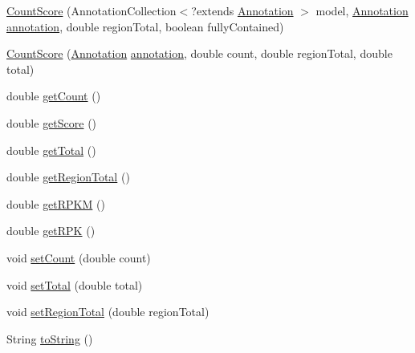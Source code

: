\begin{DoxyCompactItemize}
\item 
\hyperlink{classumms_1_1core_1_1model_1_1score_1_1_count_score_a49a9bdef1add962b8c88aeba0c40aa3c}{Count\+Score} (Annotation\+Collection$<$?extends \hyperlink{interfaceumms_1_1core_1_1annotation_1_1_annotation}{Annotation} $>$ model, \hyperlink{interfaceumms_1_1core_1_1annotation_1_1_annotation}{Annotation} \hyperlink{classumms_1_1core_1_1model_1_1score_1_1_window_score_1_1_abstract_window_score_a455fb02f18f492e611113b9da0a24888}{annotation}, double region\+Total, boolean fully\+Contained)
\item 
\hyperlink{classumms_1_1core_1_1model_1_1score_1_1_count_score_af02e5447125bbaafd033aa386f28d9d3}{Count\+Score} (\hyperlink{interfaceumms_1_1core_1_1annotation_1_1_annotation}{Annotation} \hyperlink{classumms_1_1core_1_1model_1_1score_1_1_window_score_1_1_abstract_window_score_a455fb02f18f492e611113b9da0a24888}{annotation}, double count, double region\+Total, double total)
\item 
double \hyperlink{classumms_1_1core_1_1model_1_1score_1_1_count_score_a906acf2141cba6fab150c85de37ca2b5}{get\+Count} ()
\item 
double \hyperlink{classumms_1_1core_1_1model_1_1score_1_1_count_score_a1308c7c7d75f339947c29575099d41c3}{get\+Score} ()
\item 
double \hyperlink{classumms_1_1core_1_1model_1_1score_1_1_count_score_a4668d5a19912f7f9bf52c6c3b8fe2b2c}{get\+Total} ()
\item 
double \hyperlink{classumms_1_1core_1_1model_1_1score_1_1_count_score_a067ecd35931600525a2fcd10c25d0f7a}{get\+Region\+Total} ()
\item 
double \hyperlink{classumms_1_1core_1_1model_1_1score_1_1_count_score_ae4061b9bc8daf3b622533645ae73902c}{get\+R\+P\+K\+M} ()
\item 
double \hyperlink{classumms_1_1core_1_1model_1_1score_1_1_count_score_a922204b474c2dd5aea50202778bc34b6}{get\+R\+P\+K} ()
\item 
void \hyperlink{classumms_1_1core_1_1model_1_1score_1_1_count_score_a1dd7fbb7fe3cd767c9ebde283256ffde}{set\+Count} (double count)
\item 
void \hyperlink{classumms_1_1core_1_1model_1_1score_1_1_count_score_a7a9fde34261326ae89b9b5260be28648}{set\+Total} (double total)
\item 
void \hyperlink{classumms_1_1core_1_1model_1_1score_1_1_count_score_a4fe9cdf1116853ad26cfdb39ff53617e}{set\+Region\+Total} (double region\+Total)
\item 
String \hyperlink{classumms_1_1core_1_1model_1_1score_1_1_count_score_a504281b5815d92da97dc3adf5c611fde}{to\+String} ()

\end{DoxyCompactItemize}
